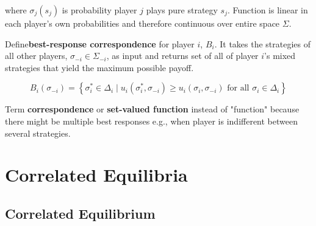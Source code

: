 \documentclass[../Main.tex]{subfiles}
\begin{document}
\begin{enumerate}
where $\sigma_j(s_j)$ is probability player $j$ plays pure strategy $s_j$. Function is linear in each player's own probabilities and therefore continuous over entire space $\Sigma$.

Define\textbf{best-response correspondence} for player $i$, $B_i$. It takes the strategies of all other players, $\sigma_{-i} \in \Sigma_{-i}$, as input and returns set of all of player $i$'s mixed strategies that yield the maximum possible payoff.

\begin{equation}
B_i(\sigma_{-i}) = \left\{ \sigma_i^* \in \Delta_i \mid u_i(\sigma_i^*, \sigma_{-i}) \ge u_i(\sigma_i, \sigma_{-i}) \text{ for all } \sigma_i \in \Delta_i \right\}
\end{equation}

Term \textbf{correspondence} or \textbf{set-valued function} instead of "function" because there might be multiple best responses e.g., when player is indifferent between several strategies.

\end{enumerate}

\section{Correlated Equilibria}
\subsection{Correlated Equilibrium}
\end{document}
